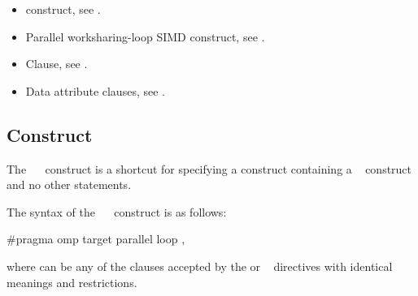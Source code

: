 \crossreferences
\begin{itemize}
\item {} construct, see
.

\item Parallel worksharing-loop SIMD construct, see
.

\item {} Clause, see .

\item Data attribute clauses, see
.

\end{itemize}









\subsection{   Construct}
\label{subsec:target parallel loop Construct}
\summary
The ~~ construct is a shortcut for specifying a  construct containing a ~ construct and no other statements.

\syntax
\begin{ccppspecific}
The syntax of the ~~ construct is as follows:

\begin{ompcPragma}
#pragma omp target parallel loop \plc{[clause[ [},\plc{] clause] ... ] new-line}
\end{ompcPragma}

where  can be any of the clauses accepted by the  or ~
directives with identical meanings and restrictions.
\end{ccppspecific}


